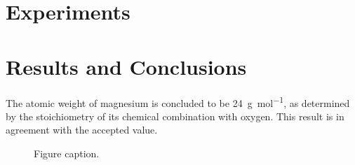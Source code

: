 \documentclass[
	letterpaper, %
	10pt, %
]{class}
\begin{document}
\section{Experiments}


\section{Results and Conclusions}

The atomic weight of magnesium is concluded to be \SI{24}{\gram\per\mol}, as determined by the stoichiometry of its chemical combination with oxygen. This result is in agreement with the accepted value.

\begin{figure}[H] %
	\centering %
	\caption{Figure caption.}
\end{figure}


\printbibliography %

\end{document}
